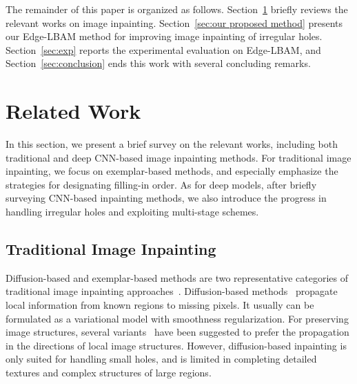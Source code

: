 \documentclass[10pt,journal,compsoc]{IEEEtran}
\begin{document}
The remainder of this paper is organized as follows.
%
Section~\ref{sec:related_work} briefly reviews the relevant works on image inpainting.
%
Section~\ref{sec:our proposed method} presents our Edge-LBAM method for improving image inpainting of irregular holes.
%
Section~\ref{sec:exp} reports the experimental evaluation on Edge-LBAM, and Section~\ref{sec:conclusion} ends this work with several concluding remarks.



\section{Related Work}\label{sec:related_work}
%
In this section, we present a brief survey on the relevant works, including both traditional and deep CNN-based image inpainting methods.
%
For traditional image inpainting, we focus on exemplar-based methods, and especially emphasize the strategies for designating filling-in order.
%
As for deep models, after briefly surveying CNN-based inpainting methods, we also introduce the progress in handling irregular holes and exploiting multi-stage schemes.
%
%
%
%
\subsection{Traditional Image Inpainting}\label{section2.1}
%
Diffusion-based and exemplar-based methods are two representative categories of traditional image inpainting approaches~\cite{guillemot2013image}.
%
%
Diffusion-based methods~\cite{BertalmioInpainting} propagate local information from known regions to missing pixels.
%
It usually can be formulated as a variational model with smoothness regularization.
%
For preserving image structures, several variants~\cite{ballester2001filling,chan2001local} have been suggested to prefer the propagation in the directions of local image structures.
%
However, diffusion-based inpainting is only suited for handling small holes, and is limited in completing detailed textures and complex structures of large regions.
\end{document}
